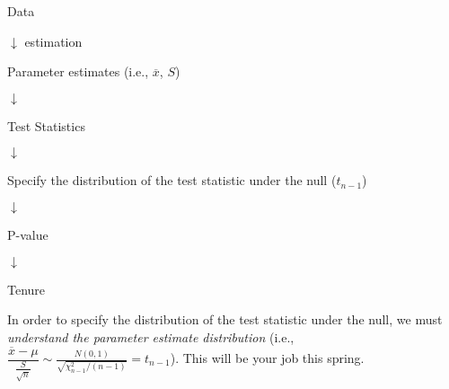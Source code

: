 \documentclass[11pt,letterpaper]{article}
\begin{document}
\begin{center}
Data 

\hspace{18mm} $\downarrow$  estimation

Parameter estimates (i.e., $\overline{x}$, $S$)

$\downarrow$ 

Test Statistics

$\downarrow$ 

Specify the distribution of the test statistic under the null ($t_{n-1}$)

$\downarrow$ 

P-value 

$\downarrow$ 

Tenure
\end{center}
In order to specify the distribution of the test statistic under the null, we must \emph{understand the parameter estimate distribution} (i.e., $\dfrac{\overline{x}-\mu}{\frac{S}{\sqrt{n}}} \sim \frac{N(0,1)}{\sqrt{\chi^2_{n-1}/(n-1)}}=t_{n-1}$). This will be your job this spring. 
\end{document}
